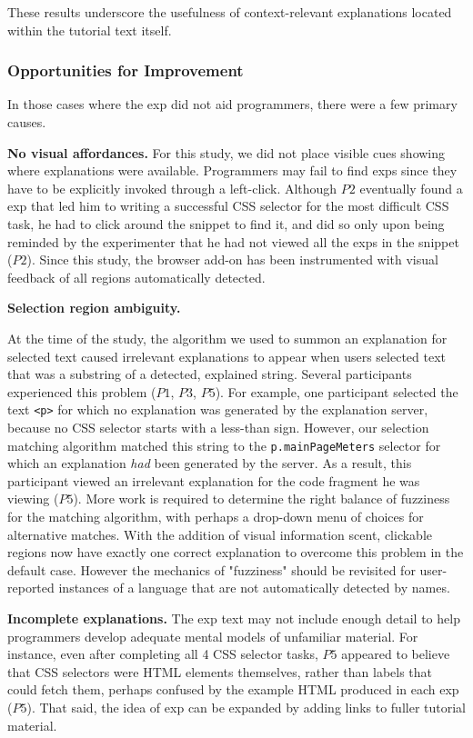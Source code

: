 These results underscore the usefulness of context-relevant explanations located within the tutorial text itself.

\subsubsection{Opportunities for Improvement}
In those cases where the \gls{exp} did not aid programmers, there were a few primary causes.

{\bf No visual affordances.} For this study, we did not place  visible cues showing where explanations were available.
Programmers may fail to find \glspl{exp} since they have to be explicitly invoked through a left-click.
Although $P2$ eventually found a \gls{exp} that led him to writing a successful CSS selector for the most difficult CSS task, he had to click around the snippet to find it, and did so only upon being reminded by the experimenter that he had not viewed all the \glspl{exp} in the snippet ($P2$).
\fi
Since this study, the browser add-on has been instrumented with visual feedback of all regions automatically detected.

{\bf Selection region ambiguity.}
\begin{changes}
At the time of the study, the algorithm we used to summon an explanation for selected text caused irrelevant explanations to appear when users selected text that was a substring of a detected, explained string.
Several participants experienced this problem ($P1$, $P3$, $P5$).
For example, one participant selected the text \texttt{<p>} for which no explanation was generated by the explanation server, because no CSS selector starts with a less-than sign.
However, our selection matching algorithm matched this string to the \texttt{p.mainPageMeters} selector for which an explanation \emph{had} been generated by the server.
As a result, this participant viewed an irrelevant explanation for the code fragment he was viewing ($P5$).
More work is required to determine the right balance of fuzziness for the matching algorithm, with perhaps a drop-down menu of choices for alternative matches.
\fi
With the addition of visual information scent, clickable regions now have exactly one correct explanation to overcome this problem in the default case.
However the mechanics of "fuzziness" should be revisited for user-reported instances of a language that are not automatically detected by \glspl{name}.
\end{changes}

{\bf Incomplete explanations.} The  \gls{exp} text may not include enough detail to help programmers  develop adequate mental models of unfamiliar material. For instance,
even after completing all 4 CSS selector tasks, $P5$ appeared to believe that CSS selectors were HTML elements themselves, rather than labels that could fetch them, perhaps confused by the example HTML produced in each \gls{exp} ($P5$).
That said, the idea of \gls{exp} can be expanded by adding links to fuller tutorial material.
